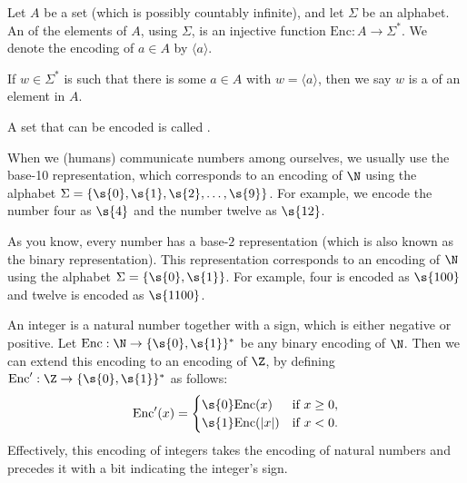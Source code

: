 \begin{flex}
\begin{definition} \label{definition:Encoding-of-a-set}
Let $A$ be a set (which is possibly countably infinite), and let $\Sigma$ be an alphabet. 
An  of the elements of $A$, using $\Sigma$, is an injective function $\text{Enc}: A \to \Sigma^*$. 
We denote the encoding of $a \in A$ by $\langle a \rangle$. 

If $w \in \Sigma^*$ is such that there is some $a \in A$ with $w = \langle a \rangle$, then we say $w$ is a  of an element in $A$. 

A set that can be encoded is called .
\end{definition}

\begin{example} \label{example:Decimal-encoding-of-naturals}
When we (humans) communicate numbers among ourselves, we usually use the base-10 representation, which corresponds to an encoding of $\N$ using the alphabet $\Sigma = \{\s{0},\s{1},\s{2},\ldots, \s{9}\}$. For example, we encode the number four as $\s{4}$ and the number twelve as $\s{12}$.
\end{example}

\begin{example} \label{example:Binary-encoding-of-naturals}
As you know, every number has a base-$2$ representation (which is also known as the binary representation). This representation corresponds to an encoding of $\N$ using the alphabet $\Sigma = \{\s{0},\s{1}\}$. For example, four is encoded as $\s{100}$ and twelve is encoded as $\s{1100}$.
\end{example}

\begin{example} \label{example:Binary-encoding-of-integers}
An integer is a natural number together with a sign, which is either negative or positive. Let $\text{Enc} : \N \to \{\s{0},\s{1}\}^*$ be any binary encoding of $\N$. Then we can extend this encoding to an encoding of $\Z$, by defining $\text{Enc}':\Z \to \{\s{0},\s{1}\}^*$ as follows:
\[
\text{Enc}'(x) = 
\begin{cases}
\s{0}\text{Enc}(x) & \text{if $x \geq 0$}, \\
\s{1}\text{Enc}(|x|) & \text{if $x < 0$}.
\end{cases}
\]
Effectively, this encoding of integers takes the encoding of natural numbers and precedes it with a bit indicating the integer's sign.
\end{example}


\end{flex}
